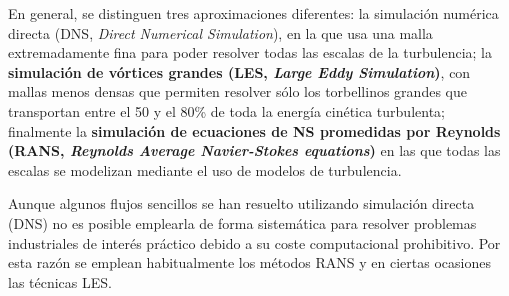 En general, se distinguen tres aproximaciones diferentes: la simulación
numérica directa (DNS, \emph{Direct Numerical Simulation}), en la que
usa una malla extremadamente fina para poder resolver todas las escalas
de la turbulencia; la \textbf{simulación de vórtices grandes (LES,
\emph{Large Eddy Simulation})}, con mallas menos densas que permiten
resolver sólo los torbellinos grandes que transportan entre el 50 y el
80\% de toda la energía cinética turbulenta; finalmente la
\textbf{simulación de ecuaciones de NS promedidas por Reynolds (RANS,
\emph{Reynolds Average Navier-Stokes equations})} en las que todas las
escalas se modelizan mediante el uso de modelos de turbulencia.

Aunque algunos flujos sencillos se han resuelto utilizando simulación
directa (DNS) no es posible emplearla de forma sistemática para resolver
problemas industriales de interés práctico debido a su coste
computacional prohibitivo. Por esta razón se emplean habitualmente los
métodos RANS y en ciertas ocasiones las técnicas LES.

